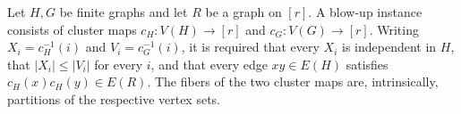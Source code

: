 \begin{definition}
Let $H,G$ be finite graphs and let $R$ be a graph on $[r]$.  A blow-up instance consists of cluster maps $c_H:V(H)\to[r]$ and $c_G:V(G)\to[r]$.  Writing $X_i=c_H^{-1}(i)$ and $V_i=c_G^{-1}(i)$, it is required that every $X_i$ is independent in $H$, that $|X_i|\leq|V_i|$ for every $i$, and that every edge $xy\in E(H)$ satisfies $c_H(x)c_H(y)\in E(R)$.  The fibers of the two cluster maps are, intrinsically, partitions of the respective vertex sets.
\end{definition}
